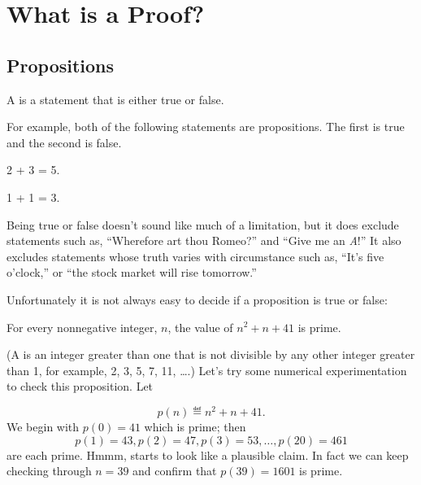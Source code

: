 \chapter{What is a Proof?}\label{proofs_chap}

\section{Propositions}\label{prop_sec}

\begin{definition*}
  A  is a statement that is either true or false.
\end{definition*}

For example, both of the following statements are propositions.  The
first is true and the second is false.
\begin{proposition}
2 + 3 = 5.
\end{proposition}

\begin{proposition}
1 + 1 = 3.
\end{proposition}

Being true or false doesn't sound like much of a limitation, but it does
exclude statements such as, ``Wherefore art thou Romeo?'' and ``Give me an
\emph{A}!''  It also excludes statements whose truth varies with
circumstance such as, ``It's five o'clock,'' or ``the stock market will
rise tomorrow.''

\iffalse
Being ``mathematical'' is a more serious restriction.  For example,
``Albert's wife's name is `Irene'~'' is a true statement, and you
could prove it by presenting legal documents and the testimony of
their children.  But it isn't a proposition because it is not a
\emph{mathematical} statement.  There is no mathematical definition of
Albert or Irene, and statements about them are not part of
mathematics.  Propositions must be about well-defined mathematical
objects like numbers, sets, functions, relations, \etc, and they must
be stated using mathematically precise language.  We can illustrate
this with a few examples.
\fi

Unfortunately it is not always easy to decide if a proposition is true
or false:
\begin{proposition}\label{41form}
For every nonnegative integer, $n$, the value of $n^2 + n + 41$ is prime.
\end{proposition}
(A  is an integer greater than one that is not divisible by
any other integer greater than 1, for example, 2, 3, 5, 7, 11, \dots.)
Let's try some numerical experimentation to check this proposition.
Let
\begin{equation}\label{pn41}
p(n) \eqdef  n^2 + n + 41.
\end{equation}
We begin with $p(0) = 41$ which is prime; then\[
p(1) = 43, p(2) = 47, p(3)=53, \dots, p(20) = 461
\]
are each prime.  Hmmm, starts to look like a plausible claim.  In fact
we can keep checking through $n=39$ and confirm that $p(39)=1601$ is
prime.

